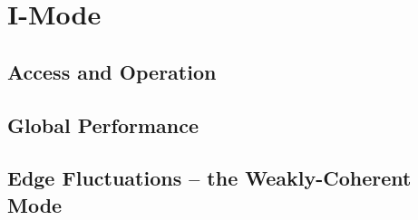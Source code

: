 \section{I-Mode}\label{sec:hcr_imode}

\subsection{Access and Operation}\label{subsec:hcr_imode_access}

\subsection{Global Performance}\label{subsec:hcr_imode_performance}

\subsection{Edge Fluctuations -- the Weakly-Coherent Mode}\label{subsec:hcr_imode_wcm}

\nicechapterending


